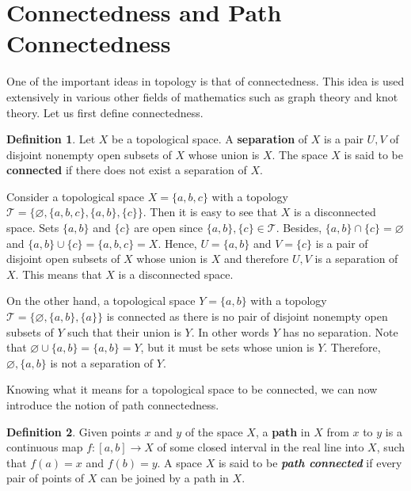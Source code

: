 \documentclass{article}
\newcommand{\topology}{\mathcal{T}}              %
\renewcommand{\emptyset}{\varnothing}            %
\newcommand\und[1]{\underline{\smash{#1}}}       %
\theoremstyle{definition}
\newtheorem*{definition}{Definition}
\begin{document}
\section*{\centering Connectedness and Path Connectedness}
One of the important ideas in topology is that of connectedness.
This idea is used extensively in various other fields of mathematics such as graph theory and knot theory.
Let us first define connectedness.

\begin{definition}
\cite{8} Let $X$ be a topological space. A \textbf{separation} of $X$ is a pair $U, V$ of disjoint
nonempty open subsets of $X$ whose union is $X$. The space $X$ is said to be \textbf{connected}
if there does not exist a separation of $X$.
\end{definition}

Consider a topological space $X = \{a, b, c\}$ with a topology $\topology = \{\emptyset, \{a, b, c\}, \{a, b\}, \{c\}\}$.
Then it is easy to see that $X$ is a disconnected space. Sets $\{a, b\}$ and $\{c\}$ are open since $\{a, b\}, \{c\} \in \topology$.
Besides, $\{a, b\} \cap \{c\} = \emptyset$ and $\{a, b\} \cup \{c\} = \{a, b, c\} = X$.
Hence, $U = \{a, b\}$ and $V = \{c\}$ is a pair of disjoint open subsets of $X$ whose union is $X$
and therefore $U, V$ is a separation of $X$. This means that $X$ is a disconnected space.

\bigskip

On the other hand, a topological space $Y = \{a, b\}$ with a topology $\topology = \{\emptyset, \{a, b\}, \{a\}\}$
is connected as there is no pair of disjoint nonempty open subsets of $Y$ such that their union is $Y$.
In other words $Y$ has no separation. Note that $\emptyset \cup \{a, b\} = \{a, b\} = Y$, but it must be \und{nonempty}
sets whose union is $Y$. Therefore, $\emptyset, \{a, b\}$ is not a separation of $Y$.

\bigskip

Knowing what it means for a topological space to be connected, we can now introduce the notion
of path connectedness.

\begin{definition}
\cite{9} Given points $x$ and $y$ of the space $X$, a \textbf{path} in $X$ from $x$ to $y$ is a 
continuous map $f : [a, b] \to X$ of some closed interval in the real line into $X$, such
that $f(a) = x$ and $f(b) = y$. A space $X$ is said to be \textit{\textbf{path connected}} if every pair of
points of $X$ can be joined by a path in $X$.
\end{definition}
\end{document}
